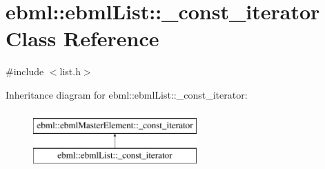 \hypertarget{classebml_1_1ebmlList_1_1__const__iterator}{}\section{ebml\+:\+:ebml\+List\+:\+:\+\_\+const\+\_\+iterator Class Reference}
\label{classebml_1_1ebmlList_1_1__const__iterator}


{\ttfamily \#include $<$list.\+h$>$}

Inheritance diagram for ebml\+:\+:ebml\+List\+:\+:\+\_\+const\+\_\+iterator\+:\begin{figure}[H]
\begin{center}
\leavevmode
\includegraphics[height=2.000000cm]{classebml_1_1ebmlList_1_1__const__iterator}
\end{center}
\end{figure}
